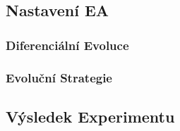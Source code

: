 \subsection{Nastavení EA}

\subsubsection{Diferenciální Evoluce}

\subsubsection{Evoluční Strategie}

\subsection{Výsledek Experimentu}
